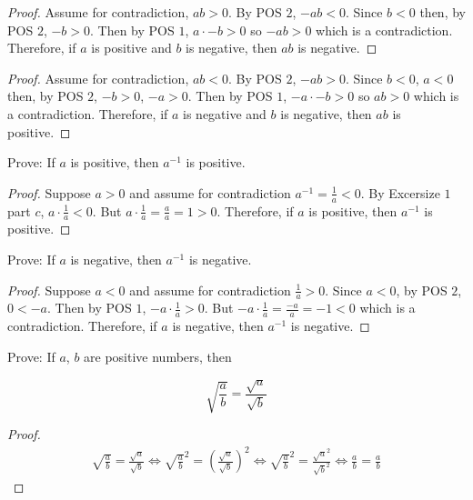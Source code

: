 \begin{proof}
    Assume for contradiction, $ab > 0$. By POS $2$, $-ab < 0$. Since $b < 0$ then, by POS $2$, $-b > 0$.
    Then by POS $1$, $a \cdot -b > 0$ so $-ab > 0$
    which is a contradiction. Therefore, if $a$ is positive and $b$ is negative, then $ab$ is negative.
\end{proof}

\begin{proof}
    Assume for contradiction, $ab < 0$. By POS $2$, $-ab > 0$. Since $b < 0$, $a < 0$ then, by POS $2$, $-b > 0$, $-a > 0$.
    Then by POS $1$, $-a \cdot -b > 0$ so $ab > 0$
    which is a contradiction. Therefore, if $a$ is negative and $b$ is negative, then $ab$ is positive.
\end{proof}

\begin{tcolorbox}[title=Problem 2, breakable]
    Prove: If $a$ is positive, then $a^{-1}$ is positive.
\end{tcolorbox}

\begin{proof}
    Suppose $a > 0$ and assume for contradiction $a^{-1} = \frac{1}{a} < 0$.  
    By Excersize $1$ part $c$, $a \cdot \frac{1}{a} < 0$.
    But $a \cdot \frac{1}{a} = \frac{a}{a} = 1 > 0$.
    Therefore, if $a$ is positive, then $a^{-1}$ is positive.
\end{proof}

\begin{tcolorbox}[title=Problem 3, breakable]
    Prove: If $a$ is negative, then $a^{-1}$ is negative.
\end{tcolorbox}

\begin{proof}
    Suppose $a < 0$ and assume for contradiction $\frac{1}{a} > 0$.  
    Since $a < 0$, by POS $2$, $0 < -a$. 
    Then by POS $1$, $-a \cdot \frac{1}{a} > 0$.
    But $-a \cdot \frac{1}{a} = \frac{-a}{a} = -1 < 0$ which is a contradiction.
    Therefore, if $a$ is negative, then $a^{-1}$ is negative.
\end{proof}

\begin{tcolorbox}[title=Problem 4, breakable]
    Prove: If $a$, $b$ are positive numbers, then 

    \[\sqrt{\frac{a}{b}} = \frac{\sqrt{a}}{\sqrt{b}}\]
\end{tcolorbox}

\begin{proof}
    \begin{align*}
        \sqrt{\frac{a}{b}} = \frac{\sqrt{a}}{\sqrt{b}} 
        \iff {\sqrt{\frac{a}{b}}}^2 = \left(\frac{\sqrt{a}}{\sqrt{b}}\right)^2
        \iff {\sqrt{\frac{a}{b}}}^2 = {\frac{\sqrt{a}^2}{\sqrt{b}^2}}
        \iff {\frac{a}{b} = \frac{a}{b}}
    \end{align*}
\end{proof}

